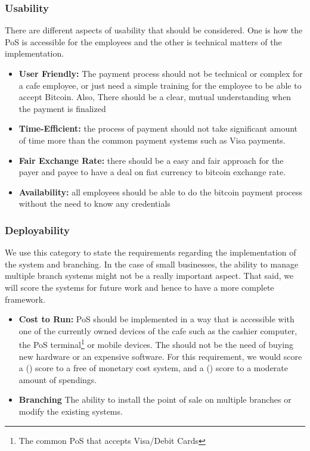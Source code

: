 \subsubsection{Usability} There are different aspects of usability that should be considered. One is how the PoS is accessible for the employees and the other is technical matters of the implementation.
\begin{itemize}

\item \textbf{User Friendly: }The payment process should not be technical or complex for a cafe employee, or just need a simple training for the employee to be able to accept Bitcoin. Also, There should be a clear, mutual understanding when the payment is finalized

\item \textbf{Time-Efficient: }the process of payment should not take significant amount of time more than the common payment systems such as Visa payments.

\item \textbf{Fair Exchange Rate: }there should be a easy and fair approach for the payer and payee to have a deal on fiat currency to bitcoin exchange rate.

\item \textbf{Availability: }all employees should be able to do the bitcoin payment process without the need to know any credentials

\end{itemize}
\subsubsection{Deployability} We use this category to state the requirements regarding the implementation of the system and branching. In the case of small businesses, the ability to manage multiple branch systems might not be a really important aspect. That said, we will score the systems for future work and hence to have a more complete framework.
\begin{itemize}

\item \textbf{Cost to Run: }PoS should be implemented in a way that is accessible with one of the currently owned devices of the cafe such as the cashier computer, the PoS terminal\footnote{The common PoS that accepts Visa/Debit Cards} or mobile devices. The should not be the need of buying new hardware or an expensive software. For this requirement, we would score a (\full) score to a free of monetary cost system, and a (\prt) score to a moderate amount of spendings.

\item \textbf{Branching} The ability to install the point of sale on multiple branches or modify the existing systems.

\end{itemize}
 
